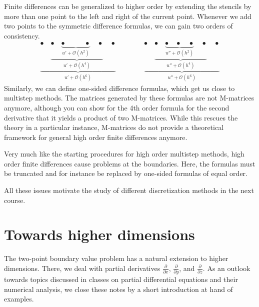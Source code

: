 \begin{remark}
  Finite differences can be generalized to higher order by extending
  the stencils by more than one point to the left and right of the
  current point. Whenever we add two points to the symmetric
  difference formulas, we can gain two orders of consistency.
  \begin{gather*}
    \underbrace{\bullet\quad
      \underbrace{\bullet\quad
        \underbrace{\bullet\quad\phantom{\bullet}\quad\bullet}_{u'+\mathcal O(h^2)}
        \quad\bullet}_{u'+\mathcal O(h^4)}
      \quad\bullet}_{u'+\mathcal O(h^6)}
    \qquad\qquad
    \underbrace{\bullet\quad
      \underbrace{\bullet\quad
        \underbrace{\bullet\quad\bullet\quad\bullet}_{u''+\mathcal O(h^2)}
        \quad\bullet}_{u''+\mathcal O(h^4)}
      \quad\bullet}_{u''+\mathcal O(h^6)}
  \end{gather*}
  Similarly, we can define one-sided difference formulas, which get us
  close to multistep methods. The matrices generated by these formulas
  are not M-matrices anymore, although you can show for the 4th order
  formula for the second derivative that it yields a product of two
  M-matrices. While this rescues the theory in a particular instance,
  M-matrices do not provide a theoretical framework for general high
  order finite differences anymore.

  Very much like the starting procedures for high order multistep
  methods, high order finite differences cause problems at the
  boundaries. Here, the formulas must be truncated and for instance be
  replaced by one-sided formulas of equal order.
  
  All these issues motivate the study of different discretization
  methods in the next course.
\end{remark}

\section{Towards higher dimensions}

\begin{intro}
  The two-point boundary value problem has a natural extension to
  higher dimensions. There, we deal with partial derivatives
  $\frac{\partial}{\partial x}$, $\frac{\partial}{\partial y}$, and
  $\frac{\partial}{\partial z}$. As an outlook towards topics
  discussed in classes on partial differential equations and their
  numerical analysis, we close these notes by a short introduction at
  hand of examples.
\end{intro}

